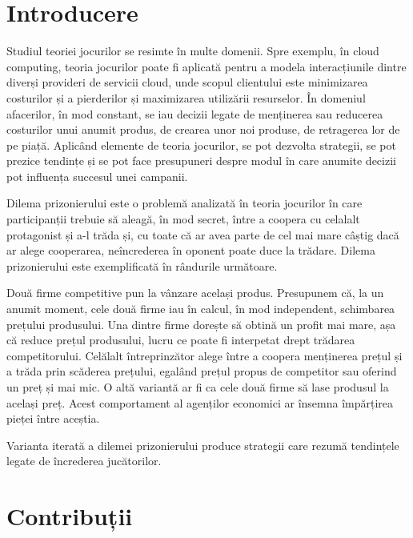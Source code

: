 \chapter*{Introducere}

Studiul teoriei jocurilor se resimte în multe domenii. Spre exemplu, în cloud computing, teoria jocurilor poate fi aplicată pentru a modela interacțiunile dintre diverși provideri de servicii cloud, unde scopul clientului este minimizarea costurilor și a pierderilor și maximizarea utilizării resurselor. În domeniul afacerilor, în mod constant, se iau decizii legate de menținerea sau reducerea costurilor unui anumit produs, de crearea unor noi produse, de retragerea lor de pe piață. Aplicând elemente de teoria jocurilor, se pot dezvolta strategii, se pot prezice tendințe și se pot face presupuneri despre modul în care anumite decizii pot influența succesul unei campanii. 

Dilema prizonierului este o problemă analizată în teoria jocurilor în care participanții trebuie să aleagă, în mod secret, între a coopera cu celalalt protagonist și a-l trăda și, cu toate că ar avea parte de cel mai mare câștig dacă ar alege cooperarea, neîncrederea în oponent poate duce la trădare.  Dilema prizonierului este exemplificată în rândurile următoare. 
 
Două firme competitive pun la vânzare același produs. Presupunem că, la un anumit moment, cele două firme iau în calcul, în mod independent, schimbarea prețului produsului. Una dintre firme dorește să obtină un profit mai mare, așa că reduce prețul produsului, lucru ce poate fi interpetat drept trădarea competitorului. Celălalt întreprinzător alege între a coopera menținerea prețul și a trăda prin scăderea prețului, egalând prețul propus de competitor sau oferind un preț și mai mic. O altă variantă ar fi ca cele două firme să lase produsul la același preț. Acest comportament al agenților economici ar însemna împărțirea pieței între aceștia. 
  
Varianta iterată a dilemei prizonierului produce strategii care rezumă tendințele legate de încrederea jucătorilor.  

\chapter*{Contribuții}